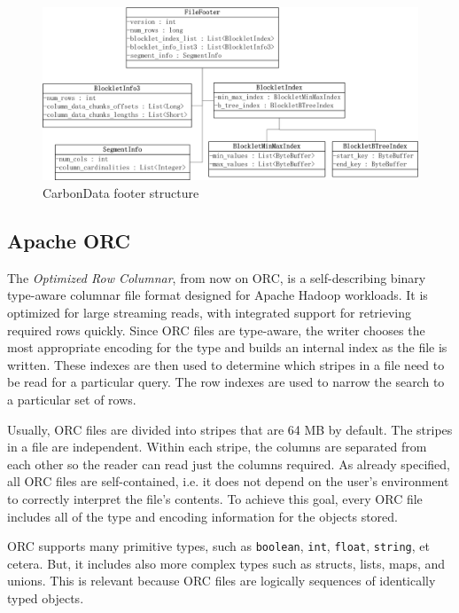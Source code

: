 \documentclass[10pt, a4paper]{report}
\begin{document}
\begin{figure}
	\centering
	\includegraphics[width=13cm]{./assets/img/carbondata/carbondata_footer_structure.png}
	\caption{CarbonData footer structure}
	\label{fig:carbondata_footer_structure}
	\vspace{0.5cm}
\end{figure}

\subsection{Apache ORC}

The \textit{Optimized Row Columnar}, from now on ORC, is a self-describing binary type-aware columnar file format designed for Apache Hadoop workloads. It is optimized for large streaming reads, with integrated support for retrieving required rows quickly. Since ORC files are type-aware, the writer chooses the most appropriate encoding for the type and builds an internal index as the file is written. These indexes are then used to determine which stripes in a file need to be read for a particular query. The row indexes are used to narrow the search to a particular set of rows.

Usually, ORC files are divided into stripes that are 64 MB by default. The stripes in a file are independent. Within each stripe, the columns are separated from each other so the reader can read just the columns required\cite{orc_homepage}. As already specified, all ORC files are self-contained, i.e. it does not depend on the user’s environment to correctly interpret the file’s contents. To achieve this goal, every ORC file includes all of the type and encoding information for the objects stored.

ORC supports many primitive types, such as \texttt{boolean}, \texttt{int}, \texttt{float}, \texttt{string}, et cetera. But, it includes also more complex types such as structs, lists, maps, and unions. This is relevant because ORC files are logically sequences of identically typed objects.
\end{document}

